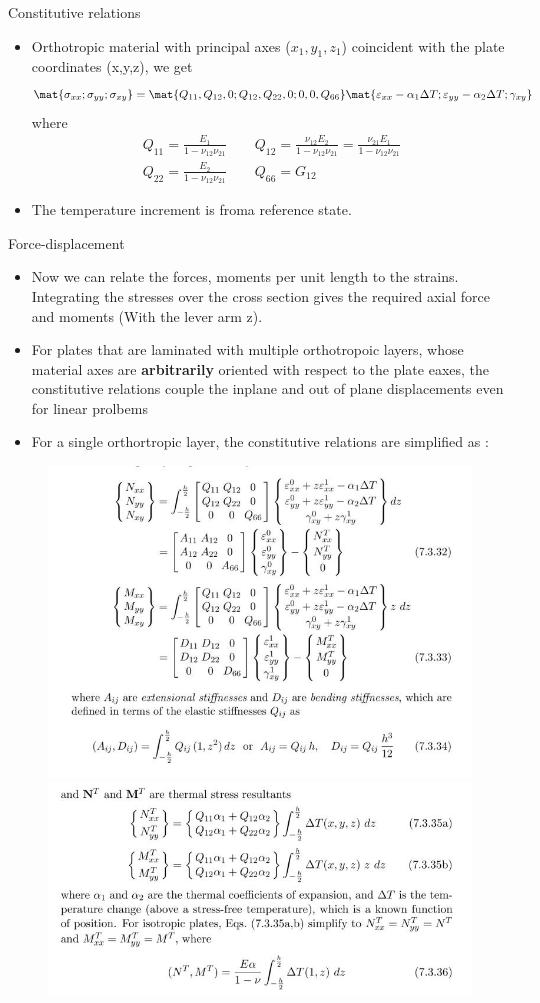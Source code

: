 	\begin{frame}{Constitutive relations}
		\begin{itemize}
			\item Orthotropic material with principal axes ($x_1,y_1,z_1$) coincident with the plate coordinates (x,y,z), we get
			\begin{equation}
			\mat{\sigma_{xx};\sigma_{yy};\sigma_{xy}} = \mat{Q_{11},Q_{12},0;Q_{12},Q_{22},0;0,0,Q_{66}}
			\mat{\varepsilon_{xx} - \alpha_1\Delta T;\varepsilon_{yy} - \alpha_2\Delta T;\gamma_{xy}}
			\end{equation}
			where 
			\begin{equation}
			\begin{aligned}
			Q_{11} =  \frac{E_1}{1-\nu_{12}\nu_{21}} \qquad Q_{12} =  \frac{\nu_{12} E_2}{1-\nu_{12}\nu_{21}} = \frac{\nu_{21} E_1}{1-\nu_{12}\nu_{21}} \\
			Q_{22} = \frac{E_2}{1-\nu_{12}\nu_{21}} \qquad Q_{66} = G_{12}
			\end{aligned}
			\end{equation}
			\item The temperature increment is froma reference state.
		\end{itemize}
	\end{frame}


	\begin{frame}{Force-displacement}
		\begin{itemize}
			\item Now we can relate the forces, moments per unit length to the strains. Integrating the stresses over the cross section gives the required axial force and moments (With the lever arm z). 
			\item For plates that are laminated with multiple orthotropoic layers, whose material axes are \textbf{arbitrarily} oriented with respect to the plate eaxes, the constitutive relations couple the inplane and out of plane displacements even for linear prolbems
			\item For a single orthortropic layer, the constitutive relations are simplified as :
		\end{itemize}
		\begin{figure}
			\centering
			\includegraphics[width=0.55\linewidth]{Figure/fig37}  	
			\includegraphics[width=0.4\linewidth]{Figure/fig38}	
		\end{figure}
	\end{frame}


